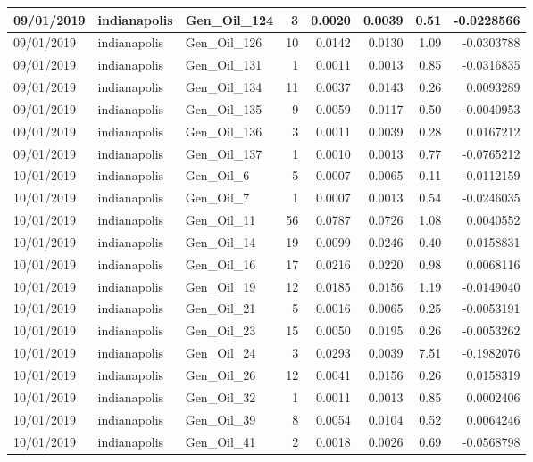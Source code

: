 \documentclass[
  letterpaper,
  DIV=11,
  numbers=noendperiod]{scrartcl}
\begin{document}
\begin{tabular}{l|l|l|r|r|r|r|r}
\hline
09/01/2019 & indianapolis & Gen\_Oil\_124 & 3 & 0.0020 & 0.0039 & 0.51 & -0.0228566\\
\hline
09/01/2019 & indianapolis & Gen\_Oil\_126 & 10 & 0.0142 & 0.0130 & 1.09 & -0.0303788\\
\hline
09/01/2019 & indianapolis & Gen\_Oil\_131 & 1 & 0.0011 & 0.0013 & 0.85 & -0.0316835\\
\hline
09/01/2019 & indianapolis & Gen\_Oil\_134 & 11 & 0.0037 & 0.0143 & 0.26 & 0.0093289\\
\hline
09/01/2019 & indianapolis & Gen\_Oil\_135 & 9 & 0.0059 & 0.0117 & 0.50 & -0.0040953\\
\hline
09/01/2019 & indianapolis & Gen\_Oil\_136 & 3 & 0.0011 & 0.0039 & 0.28 & 0.0167212\\
\hline
09/01/2019 & indianapolis & Gen\_Oil\_137 & 1 & 0.0010 & 0.0013 & 0.77 & -0.0765212\\
\hline
10/01/2019 & indianapolis & Gen\_Oil\_6 & 5 & 0.0007 & 0.0065 & 0.11 & -0.0112159\\
\hline
10/01/2019 & indianapolis & Gen\_Oil\_7 & 1 & 0.0007 & 0.0013 & 0.54 & -0.0246035\\
\hline
10/01/2019 & indianapolis & Gen\_Oil\_11 & 56 & 0.0787 & 0.0726 & 1.08 & 0.0040552\\
\hline
10/01/2019 & indianapolis & Gen\_Oil\_14 & 19 & 0.0099 & 0.0246 & 0.40 & 0.0158831\\
\hline
10/01/2019 & indianapolis & Gen\_Oil\_16 & 17 & 0.0216 & 0.0220 & 0.98 & 0.0068116\\
\hline
10/01/2019 & indianapolis & Gen\_Oil\_19 & 12 & 0.0185 & 0.0156 & 1.19 & -0.0149040\\
\hline
10/01/2019 & indianapolis & Gen\_Oil\_21 & 5 & 0.0016 & 0.0065 & 0.25 & -0.0053191\\
\hline
10/01/2019 & indianapolis & Gen\_Oil\_23 & 15 & 0.0050 & 0.0195 & 0.26 & -0.0053262\\
\hline
10/01/2019 & indianapolis & Gen\_Oil\_24 & 3 & 0.0293 & 0.0039 & 7.51 & -0.1982076\\
\hline
10/01/2019 & indianapolis & Gen\_Oil\_26 & 12 & 0.0041 & 0.0156 & 0.26 & 0.0158319\\
\hline
10/01/2019 & indianapolis & Gen\_Oil\_32 & 1 & 0.0011 & 0.0013 & 0.85 & 0.0002406\\
\hline
10/01/2019 & indianapolis & Gen\_Oil\_39 & 8 & 0.0054 & 0.0104 & 0.52 & 0.0064246\\
\hline
10/01/2019 & indianapolis & Gen\_Oil\_41 & 2 & 0.0018 & 0.0026 & 0.69 & -0.0568798\\

\end{tabular}
\end{document}
